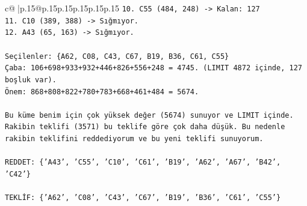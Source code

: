 \documentclass{article}
\begin{document}
{\begin{supertabular}{c@{$\;$}|p{.15\linewidth}@{}p{.15\linewidth}p{.15\linewidth}p{.15\linewidth}p{.15\linewidth}p{.15\linewidth}}
{{{\texttt{10. C55 (484, 248) {-}> Kalan: 127} \\
\texttt{11. C10 (389, 388) {-}> Sığmıyor.} \\
\texttt{12. A43 (65, 163) {-}> Sığmıyor.} \\
\\ 
\texttt{Seçilenler: \{A62, C08, C43, C67, B19, B36, C61, C55\}} \\
\texttt{Çaba: 106+698+933+932+446+826+556+248 = 4745. (LIMIT 4872 içinde, 127 boşluk var).} \\
\texttt{Önem: 868+808+822+780+783+668+461+484 = 5674.} \\
\\ 
\texttt{Bu küme benim için çok yüksek değer (5674) sunuyor ve LIMIT içinde. Rakibin teklifi (3571) bu teklife göre çok daha düşük. Bu nedenle rakibin teklifini reddediyorum ve bu yeni teklifi sunuyorum.} \\
\\ 
\texttt{REDDET: \{'A43', 'C55', 'C10', 'C61', 'B19', 'A62', 'A67', 'B42', 'C42'\}} \\
\\ 
\texttt{TEKLİF: \{'A62', 'C08', 'C43', 'C67', 'B19', 'B36', 'C61', 'C55'\}} \\
            }
        }
    }
     \\ \\


\end{supertabular}}
\end{document}
